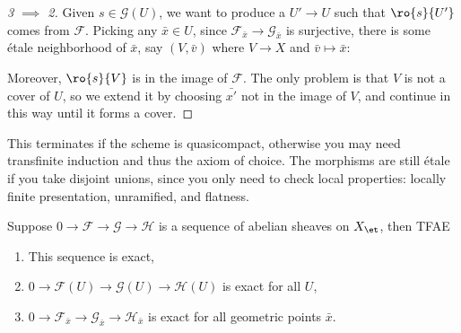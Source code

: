 \begin{proof}[3 $\implies$ 2]

Given \(s\in \mathcal{G}(U)\), we want to produce a \(U' \to U\) such
that \(\ro{s}{U'}\) comes from \(\mathcal{F}\). Picking any
\(\bar x\in U\), since \(\mathcal{F}_{\bar x} \to \mathcal{G}_{\bar x}\)
is surjective, there is some étale neighborhood of \(\bar x\), say
\((V, \bar v)\) where \(V\to X\) and \(\bar v \mapsto \bar x\):

\begin{center}
\end{center}

Moreover, \(\ro{s}{V}\) is in the image of \(\mathcal{F}\). The only
problem is that \(V\) is not a cover of \(U\), so we extend it by
choosing \(\bar{x'}\) not in the image of \(V\), and continue in this
way until it forms a cover.

\end{proof}

\begin{remark}

This terminates if the scheme is quasicompact, otherwise you may need
transfinite induction and thus the axiom of choice. The morphisms are
still étale if you take disjoint unions, since you only need to check
local properties: locally finite presentation, unramified, and flatness.

\end{remark}

\begin{lemma}[?]

Suppose \(0 \to \mathcal{F}\to \mathcal{G}\to \mathcal{H}\) is a
sequence of abelian sheaves on \(X_{\et}\), then TFAE

\begin{enumerate}
\def\labelenumi{\arabic{enumi}.}
\item
  This sequence is exact,
\item
  \(0 \to \mathcal{F}(U) \to \mathcal{G}(U) \to \mathcal{H}(U)\) is
  exact for all \(U\),
\item
  \(0 \to \mathcal{F}_{\bar x} \to \mathcal{G}_{\bar x} \to \mathcal{H}_{\bar x}\)
  is exact for all geometric points \(\bar x\).
\end{enumerate}

\end{lemma}

